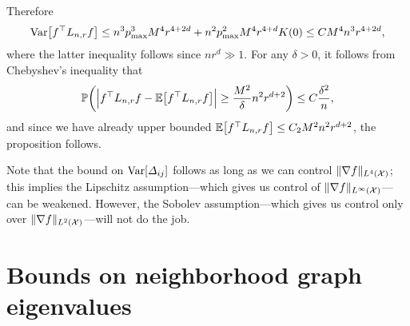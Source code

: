 Therefore
\begin{equation*}
\mathrm{Var}\bigl[f^{\top} L_{n,r} f\bigr] \leq n^3 p_{\max}^3 M^4 r^{4 + 2d} + n^2 p_{\max}^2 M^4 r^{4 + d} K(0) \leq C M^4 n^3r^{4 + 2d},
\end{equation*}
where the latter inequality follows since $nr^d \gg 1$. For any $\delta > 0$, it follows from Chebyshev's inequality that
\begin{equation*}
\mathbb{P}\biggl(\Bigl|f^{\top} L_{n,r} f - \mathbb{E}\bigl[f^{\top} L_{n,r} f\bigr]\Bigr| \geq \frac{M^2}{\delta}n^2 r^{d + 2}\biggr) \leq C\frac{\delta^2}{n},
\end{equation*}
and since we have already upper bounded $\mathbb{E}\bigl[f^{\top} L_{n,r} f\bigr] \leq C_2 M^2 n^2 r^{d + 2}$, the proposition follows. 

Note that the bound on $\mathrm{Var}[\varDelta_{i j}]$ follows as long as we can control $\|\nabla f\|_{L^4(\mathcal{X})}$; this implies the Lipschitz assumption---which gives us control of $\|\nabla f\|_{L^{\infty}(\mathcal{X})}$---can be weakened. However, the Sobolev assumption---which gives us control only over $\|\nabla f\|_{L^2(\mathcal{X})}$---will not do the job. 

\section{Bounds on neighborhood graph eigenvalues}
\label{sec:graph_eigenvalues}

